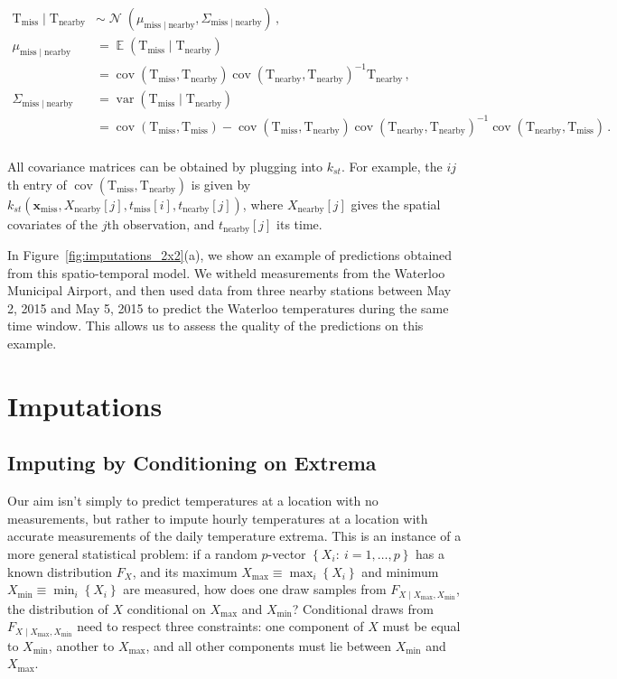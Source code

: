 \documentclass[letter]{article}
\newcommand{\genericdel}[3]{%
      \left#1#3\right#2
    }
\newcommand{\del}[1]{\genericdel(){#1}}
\newcommand{\sbr}[1]{\genericdel[]{#1}}
\newcommand{\cbr}[1]{\genericdel\{\}{#1}}
\DeclareMathOperator{\E}{\mathbb{E}}
\DeclareMathOperator{\cov}{{cov}}
\DeclareMathOperator{\var}{{var}}
\DeclareMathOperator{\normal}{\mathcal{N}}
\newcommand{\T}{\mathrm{T}}
\newcommand{\xvec}{\mathbold{x}}
\newcommand{\miss}{\mathrm{miss}}
\newcommand{\obs}{\mathrm{nearby}}
\newcommand{\Xmax}{X_{\max}}
\newcommand{\Xmin}{X_{\min}}
\newcommand{\Fcond}{F_{X \mid \Xmax,\Xmin}}
\newcommand{\eqlabel}[1]{\label{#1}}
\begin{document}
\begin{equation}
\begin{split}
    \T_\miss \mid \T_\obs &\sim \normal\del{\mu_{\miss \mid \obs}, \Sigma_{\miss \mid \obs}}\,, \\
    \mu_{\miss \mid \obs} &= \E \del{\T_\miss \mid \T_\obs} \\
        &= \cov\del{\T_\miss, \T_\obs} \cov\del{\T_\obs, \T_\obs}^{-1} \T_\obs\,, \\
    \Sigma_{\miss \mid \obs} &= \var \del{\T_\miss \mid \T_\obs} \\
        &= \cov\del{\T_\miss,\T_\miss} - \cov\del{\T_\miss, \T_\obs} \cov\del{\T_\obs, \T_\obs}^{-1} \cov\del{\T_\obs, \T_\miss}\,. \\ %
\end{split}
\eqlabel{eq:unconstrained_post}
\end{equation}

All covariance matrices can be obtained by plugging into \(k_{st}\). For example, the \(ij\)th entry of \(\cov\del{\T_\miss, \T_\obs}\) is given by \(k_{st}(\xvec_\miss,X_\obs\sbr{j},t_\miss\sbr{i},t_\obs\sbr{j})\), where \(X_\obs\sbr{j}\) gives the spatial covariates of the \(j\)th observation, and \(t_\obs\sbr{j}\) its time.

In Figure~\ref{fig:imputations_2x2}(a), we show an example of predictions obtained from this spatio-temporal model. We witheld measurements from the Waterloo Municipal Airport, and then used data from three nearby stations between May 2, 2015 and May 5, 2015 to predict the Waterloo temperatures during the same time window. This allows us to assess the quality of the predictions on this example.
    


        \section{Imputations}\label{imputations}

\subsection{Imputing by Conditioning on Extrema}\label{imputing-by-conditioning-on-extrema}
    


        Our aim isn't simply to predict temperatures at a location with no measurements, but rather to impute hourly temperatures at a location with accurate measurements of the daily temperature extrema.
This is an instance of a more general statistical problem: if a random \(p\)-vector \(\cbr{X_i:~i=1,\ldots,p}\) has a known distribution \(F_X\), and its maximum \(\Xmax \equiv \max_i\cbr{X_i}\) and minimum \(\Xmin \equiv \min_i\cbr{X_i}\) are measured, how does one draw samples from \(\Fcond\), the distribution of \(X\) conditional on \(\Xmax\) and \(\Xmin\)?
Conditional draws from \(\Fcond\) need to respect three constraints: one component of \(X\) must be equal to \(\Xmin\), another to \(\Xmax\), and all other components must lie between \(\Xmin\) and \(\Xmax\).
    
\end{document}
